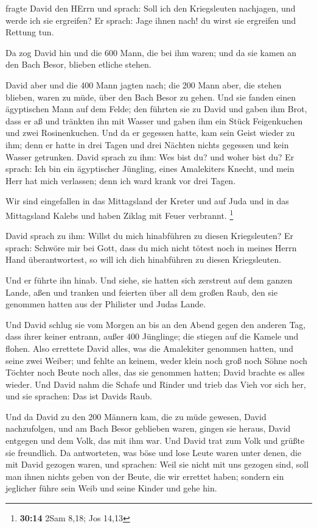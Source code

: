  fragte David den HErrn und sprach: Soll ich den
Kriegsleuten nachjagen, und werde ich sie ergreifen? Er sprach: Jage
ihnen nach! du wirst sie ergreifen und Rettung tun.

 Da zog David hin und die 600 Mann, die bei ihm waren; und
da sie kamen an den Bach Besor, blieben etliche stehen.

 David aber und die 400 Mann jagten nach; die 200 Mann
aber, die stehen blieben, waren zu müde, über den Bach Besor zu gehen.
 Und sie fanden einen ägyptischen Mann auf dem Felde; den
führten sie zu David und gaben ihm Brot, dass er aß und tränkten ihn mit
Wasser  und gaben ihm ein Stück Feigenkuchen und zwei
Rosinenkuchen. Und da er gegessen hatte, kam sein Geist wieder zu ihm;
denn er hatte in drei Tagen und drei Nächten nichts gegessen und kein
Wasser getrunken.  David sprach zu ihm: Wes bist du? und
woher bist du? Er sprach: Ich bin ein ägyptischer Jüngling, eines
Amalekiters Knecht, und mein Herr hat mich verlassen; denn ich ward
krank vor drei Tagen.

 Wir sind eingefallen in das Mittagsland der Kreter und auf
Juda und in das Mittagsland Kalebs und haben Ziklag mit Feuer verbrannt.
\footnote{\textbf{30:14} 2Sam 8,18; Jos 14,13}

 David sprach zu ihm: Willst du mich hinabführen zu diesen
Kriegsleuten? Er sprach: Schwöre mir bei Gott, dass du mich nicht tötest
noch in meines Herrn Hand überantwortest, so will ich dich hinabführen
zu diesen Kriegsleuten.

 Und er führte ihn hinab. Und siehe, sie hatten sich
zerstreut auf dem ganzen Lande, aßen und tranken und feierten über all
dem großen Raub, den sie genommen hatten aus der Philister und Judas
Lande.

 Und David schlug sie vom Morgen an bis an den Abend gegen
den anderen Tag, dass ihrer keiner entrann, außer 400 Jünglinge; die
stiegen auf die Kamele und flohen.  Also errettete David
alles, was die Amalekiter genommen hatten, und seine zwei Weiber;
 und fehlte an keinem, weder klein noch groß noch Söhne
noch Töchter noch Beute noch alles, das sie genommen hatten; David
brachte es alles wieder.  Und David nahm die Schafe und
Rinder und trieb das Vieh vor sich her, und sie sprachen: Das ist Davids
Raub.

 Und da David zu den 200 Männern kam, die zu müde gewesen,
David nachzufolgen, und am Bach Besor geblieben waren, gingen sie
heraus, David entgegen und dem Volk, das mit ihm war. Und David trat zum
Volk und grüßte sie freundlich.  Da antworteten, was böse
und lose Leute waren unter denen, die mit David gezogen waren, und
sprachen: Weil sie nicht mit uns gezogen sind, soll man ihnen nichts
geben von der Beute, die wir errettet haben; sondern ein jeglicher führe
sein Weib und seine Kinder und gehe hin.

